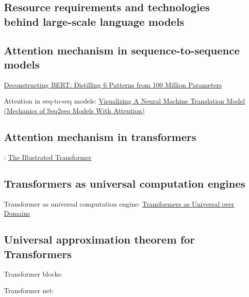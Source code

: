 \documentclass[12pt,a4paper]{article}
\begin{document}

\newpage
\subsection{Resource requirements and technologies behind large-scale language models}

\subsection{Attention mechanism in sequence-to-sequence models} 
\href{https://towardsdatascience.com/deconstructing-bert-distilling-6-patterns-from-100-million-parameters-b49113672f77}{Deconstructing BERT: Distilling 6 Patterns from 100 Million Parameters}

Attention in seq-to-seq models:
\href{https://jalammar.github.io/visualizing-neural-machine-translation-mechanics-of-seq2seq-models-with-attention/}{Visualizing A Neural Machine Translation Model (Mechanics of Seq2seq Models With Attention)}

\subsection{Attention mechanism in transformers}:
\href{https://jalammar.github.io/illustrated-transformer/}{The Illustrated Transformer} 

\subsection{Transformers as universal computation engines}
Transformer as universal computation engine: \href{https://www.youtube.com/watch?v=Elxn8rS88bI}{
Transformers as Universal over Domains}

\newpage
\subsection{Universal approximation theorem for Transformers}
Transformer blocks:\\

Transformer net: \\



\end{document}
